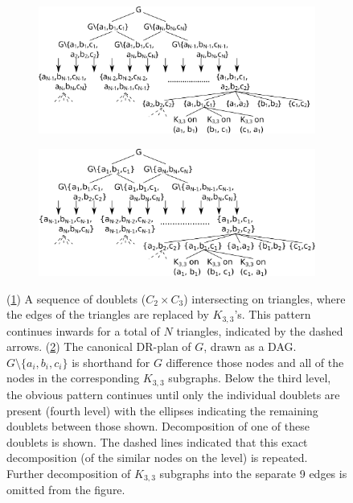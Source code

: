 \ClearMyMinHeight
{}

\begin{figure}\centering%
    \begin{subfigure}{0.3\linewidth}\centering
        \includegraphics[height=\myMinHeight]{img/svg/revised_c2c3_of_k33s}
        \caption{}\label{fig:c2c3ofk33s:a}
    \end{subfigure}%
    \hfill
    \begin{subfigure}{0.7\linewidth}\centering
        \includegraphics[height=\myMinHeight]{img/svg/revised_c2c3_of_k33s_candrp}
        \caption{}\label{fig:c2c3ofk33s:b}
    \end{subfigure}%
    \caption{
    (\ref{fig:c2c3ofk33s:a}) A sequence of doublets ($C_2 \times C_3$) intersecting on triangles, where the edges of the triangles are replaced by $K_{3,3}$'s. This pattern continues inwards for a total of $N$ triangles, indicated by the dashed arrows. (\ref{fig:c2c3ofk33s:b}) The canonical DR-plan of $G$, drawn as a DAG. $G\setminus\{a_i,b_i,c_i\}$ is shorthand for $G$ difference those nodes and all of the nodes in the corresponding $K_{3,3}$ subgraphs. Below the third level, the obvious pattern continues until only the individual doublets are present (fourth level) with the ellipses indicating the remaining doublets between those shown. Decomposition of one of these doublets is shown. The dashed lines indicated that this exact decomposition (of the similar nodes on the level) is repeated. Further decomposition of $K_{3,3}$ subgraphs into the separate 9 edges is omitted from the figure.
    }
    \label{fig:c2c3ofk33s}
\end{figure}%




